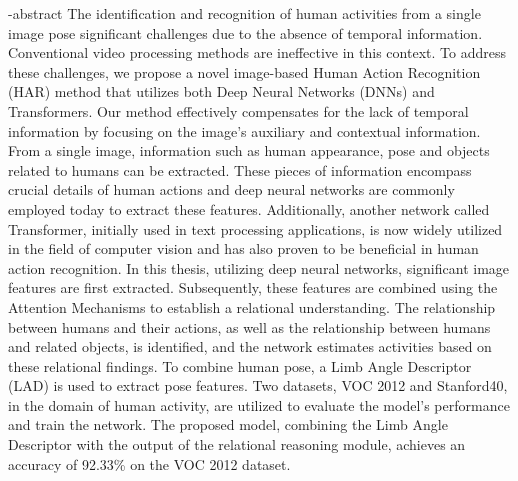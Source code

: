 
\en-abstract{
The identification and recognition of human activities from a single image pose significant challenges due to the absence of temporal information. Conventional video processing methods are ineffective in this context. To address these challenges, we propose a novel image-based Human Action Recognition (HAR) method that utilizes both Deep Neural Networks (DNNs) and Transformers. Our method effectively compensates for the lack of temporal information by focusing on the image's auxiliary and contextual information.
From a single image, information such as human appearance, pose and objects related to humans can be extracted. These pieces of information encompass crucial details of human actions and deep neural networks are commonly employed today to extract these features. Additionally, another network called Transformer, initially used in text processing applications, is now widely utilized in the field of computer vision and has also proven to be beneficial in human action recognition. 
In this thesis, utilizing deep neural networks, significant image features are first extracted. Subsequently, these features are combined using the Attention Mechanisms to establish a relational understanding. The relationship between humans and their actions, as well as the relationship between humans and related objects, is identified, and the network estimates activities based on these relational findings.
To combine human pose, a Limb Angle Descriptor (LAD) is used to extract pose features. Two datasets, VOC 2012 and Stanford40, in the domain of human activity, are utilized to evaluate the model's performance and train the network. The proposed model, combining the Limb Angle Descriptor with the output of the relational reasoning module, achieves an accuracy of 92.33\% on the VOC 2012 dataset.
}
